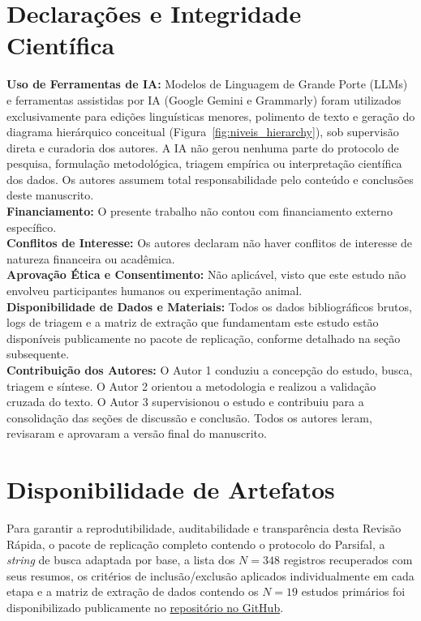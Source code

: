 \documentclass[sigconf, anonymous]{acmart}
\begin{document}
\section*{Declarações e Integridade Científica}
\label{sec:declarations}

\textbf{Uso de Ferramentas de IA:} Modelos de Linguagem de Grande Porte (LLMs) e ferramentas assistidas por IA (Google Gemini e Grammarly) foram utilizados exclusivamente para edições linguísticas menores, polimento de texto e geração do diagrama hierárquico conceitual (Figura~\ref{fig:niveis_hierarchy}), sob supervisão direta e curadoria dos autores. A IA não gerou nenhuma parte do protocolo de pesquisa, formulação metodológica, triagem empírica ou interpretação científica dos dados. Os autores assumem total responsabilidade pelo conteúdo e conclusões deste manuscrito. \\

\textbf{Financiamento:} O presente trabalho não contou com financiamento externo específico. \\
\textbf{Conflitos de Interesse:} Os autores declaram não haver conflitos de interesse de natureza financeira ou acadêmica. \\
\textbf{Aprovação Ética e Consentimento:} Não aplicável, visto que este estudo não envolveu participantes humanos ou experimentação animal. \\
\textbf{Disponibilidade de Dados e Materiais:} Todos os dados bibliográficos brutos, logs de triagem e a matriz de extração que fundamentam este estudo estão disponíveis publicamente no pacote de replicação, conforme detalhado na seção subsequente. \\
\textbf{Contribuição dos Autores:} O Autor 1 conduziu a concepção do estudo, busca, triagem e síntese. O Autor 2 orientou a metodologia e realizou a validação cruzada do texto. O Autor 3 supervisionou o estudo e contribuiu para a consolidação das seções de discussão e conclusão. Todos os autores leram, revisaram e aprovaram a versão final do manuscrito.

\section*{Disponibilidade de Artefatos}
Para garantir a reprodutibilidade, auditabilidade e transparência desta Revisão Rápida, o pacote de replicação completo contendo o protocolo do Parsifal, a \textit{string} de busca adaptada por base, a lista dos $N = 348$ registros recuperados com seus resumos, os critérios de inclusão/exclusão aplicados individualmente em cada etapa e a matriz de extração de dados contendo os $N = 19$ estudos primários foi disponibilizado publicamente no \href{https://github.com/fagnerffcs/instrumentation-levels-observability-paper}{repositório no GitHub}.



\end{document}
